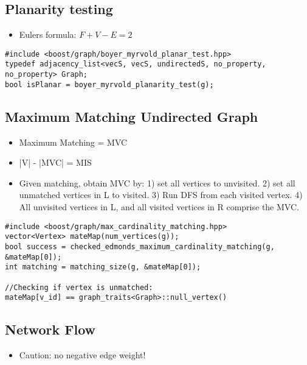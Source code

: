 \documentclass[11pt]{article}
\begin{document}
\subsection{Planarity testing}
\begin{itemize}
  \item Eulers formula: $F + V - E = 2$
\end{itemize}

\begin{lstlisting}
#include <boost/graph/boyer_myrvold_planar_test.hpp>
typedef adjacency_list<vecS, vecS, undirectedS, no_property, no_property> Graph;
bool isPlanar = boyer_myrvold_planarity_test(g);
\end{lstlisting}

\subsection{Maximum Matching Undirected Graph}
\begin{itemize}
  \item Maximum Matching = MVC
  \item |V| - |MVC| = MIS
  \item Given matching, obtain MVC by: 1) set all vertices to unvisited. 2) set all unmatched vertices in L to visited. 3) Run DFS from each visited vertex. 4) All unvisited vertices in L, and all visited vertices in R comprise the MVC.
\end{itemize}

\begin{lstlisting}
#include <boost/graph/max_cardinality_matching.hpp>
vector<Vertex> mateMap(num_vertices(g));
bool success = checked_edmonds_maximum_cardinality_matching(g, &mateMap[0]);
int matching = matching_size(g, &mateMap[0]); 

//Checking if vertex is unmatched:
mateMap[v_id] == graph_traits<Graph>::null_vertex()
\end{lstlisting}

\subsection{Network Flow}
\begin{itemize}
  \item Caution: no negative edge weight!
\end{itemize}
\end{document}
